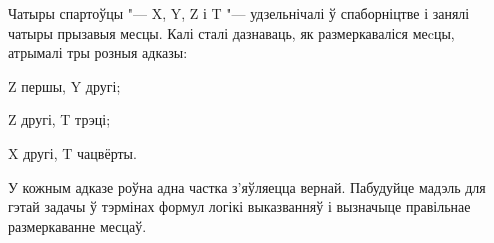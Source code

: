 \begin{problemList}
		\bigskip
		
		\item Чатыры спартоўцы "--- X, Y, Z і T "--- удзельнічалі ў спаборніцтве і занялі чатыры прызавыя месцы. Калі сталі дазнаваць, як размеркаваліся меcцы, атрымалі тры розныя адказы:
		\begin{belarusianEnumerate}
			\item Z першы, Y другі;			
			\item Z другі, T трэці;
			\item X другі, T чацвёрты.
		\end{belarusianEnumerate}
		У кожным адказе роўна адна частка з'яўляецца вернай. Пабудуйце мадэль для гэтай задачы ў тэрмінах формул логікі выказванняў і вызначыце правільнае размеркаванне месцаў. \\
	
		\bigskip
		

\end{problemList}
